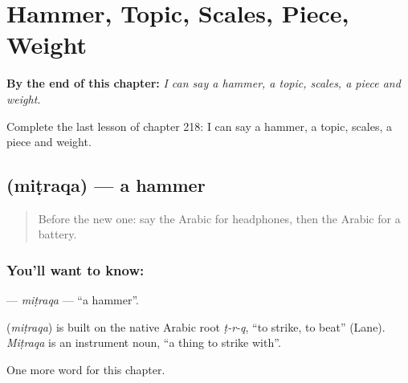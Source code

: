 
\chapter{Hammer, Topic, Scales, Piece, Weight}
\label{ch:ar-hammer-topic-scales-piece-weight}

\begin{chapteropening}
\textbf{By the end of this chapter:} \emph{I can say a hammer, a topic, scales, a piece and weight.}

Complete the last lesson of chapter 218: I can say a hammer, a topic, scales, a piece and weight.
\end{chapteropening}

\section[\texorpdfstring{\ar{مطرقة} (miṭraqa)}{مطرقة (miṭraqa)}]{ (miṭraqa) — a hammer}

\label{lesson:AR-C218-mitraqa}



\begin{quote}
Before the new one: say the Arabic for headphones, then the Arabic for a battery.
\end{quote}

\subsection*{You'll want to know: }
\textbf{} — \emph{miṭraqa} — \textquotedblleft{}a hammer\textquotedblright{}.

\begin{cousinweb}
\textbf{} (\emph{miṭraqa}) is built on the native Arabic root \emph{ṭ-r-q}, \textquotedblleft{}to strike, to beat\textquotedblright{} (Lane). \emph{Miṭraqa} is an instrument noun, \textquotedblleft{}a thing to strike with\textquotedblright{}.
\end{cousinweb}

\begin{grammarlens}[title={What you've built}]
One more word for this chapter.
\end{grammarlens}

